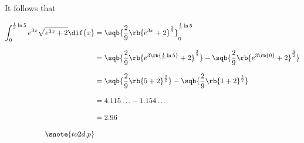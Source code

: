 \documentclass[a4paper]{tufte-handout}
\begin{document}
\begin{question}
It follows that

\begin{align*}
  \int_{0}^{\frac{1}{3}\ln{5}} e^{3x}\sqrt{e^{3x}+2} \dif{x} &= \sqb{\frac{2}{9} \rb{e^{3x} + 2}^{\frac{3}{2}}}_{0}^{\frac{1}{3}\ln{5}}\\[8pt]
  &= \sqb{\frac{2}{9} \rb{e^{3\rb{\frac{1}{3}\ln{5}}} + 2}^{\frac{3}{2}}} - \sqb{\frac{2}{9} \rb{e^{3\rb{0}} + 2}^{\frac{3}{2}}}\\[8pt]
  &= \sqb{\frac{2}{9} \rb{5 + 2}^{\frac{3}{2}}} - \sqb{\frac{2}{9} \rb{1 + 2}^{\frac{3}{2}}}\\[8pt]
  &= 4.115\ldots - 1.154\ldots\\[8pt]
  &= 2.96\\[8pt]
  \snote{to 2 d.p}
\end{align*}

\end{question}

\end{document}
